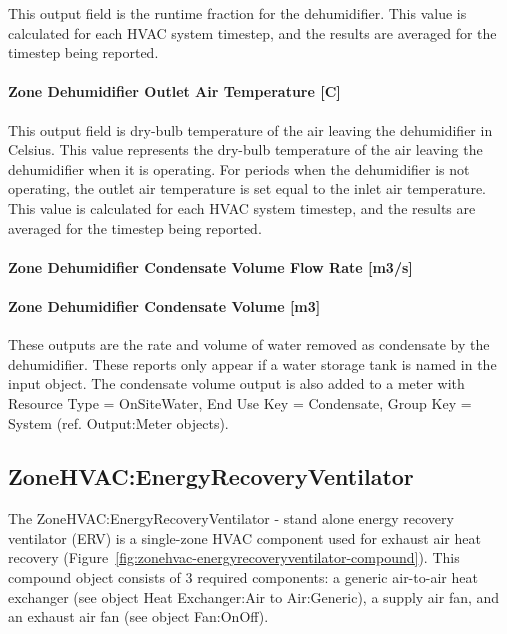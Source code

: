 This output field is the runtime fraction for the dehumidifier. This value is calculated for each HVAC system timestep, and the results are averaged for the timestep being reported.

\paragraph{Zone Dehumidifier Outlet Air Temperature {[}C{]}}\label{zone-dehumidifier-outlet-air-temperature-c}

This output field is dry-bulb temperature of the air leaving the dehumidifier in Celsius. This value represents the dry-bulb temperature of the air leaving the dehumidifier when it is operating. For periods when the dehumidifier is not operating, the outlet air temperature is set equal to the inlet air temperature. This value is calculated for each HVAC system timestep, and the results are averaged for the timestep being reported.

\paragraph{Zone Dehumidifier Condensate Volume Flow Rate {[}m3/s{]}}\label{zone-dehumidifier-condensate-volume-flow-rate-m3s}

\paragraph{Zone Dehumidifier Condensate Volume {[}m3{]}}\label{zone-dehumidifier-condensate-volume-m3}

These outputs are the rate and volume of water removed as condensate by the dehumidifier. These reports only appear if a water storage tank is named in the input object. The condensate volume output is also added to a meter with Resource Type = OnSiteWater, End Use Key = Condensate, Group Key = System (ref. Output:Meter objects).

\subsection{ZoneHVAC:EnergyRecoveryVentilator}\label{zonehvacenergyrecoveryventilator}

The ZoneHVAC:EnergyRecoveryVentilator - stand alone energy recovery ventilator (ERV) is a single-zone HVAC component used for exhaust air heat recovery (Figure~\ref{fig:zonehvac-energyrecoveryventilator-compound}). This compound object consists of 3 required components: a generic air-to-air heat exchanger (see object Heat Exchanger:Air to Air:Generic), a supply air fan, and an exhaust air fan (see object Fan:OnOff).

